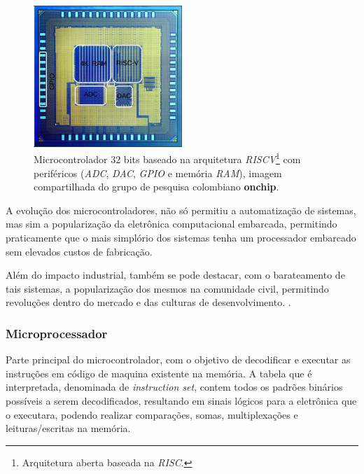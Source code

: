 \begin{figure}[!htb]
  \centering
  \caption[Microcontrolador na pastilha de silício.]{Microcontrolador 32 bits baseado na arquitetura \textit{RISCV}\footnote{Arquitetura aberta baseada na \textit{RISC}.}
  com periféricos (\textit{ADC}, \textit{DAC}, \textit{GPIO} e memória \textit{RAM}), imagem compartilhada do grupo de pesquisa
  colombiano \textbf{onchip}.}
  \label{fig:ricv}
  \includegraphics[width=0.5\textwidth]{figuras/riscv.jpg}
\end{figure}


A evolução dos microcontroladores, não só permitiu a automatização de sistemas, mas sim a popularização da eletrônica
computacional embarcada, permitindo praticamente que o mais simplório dos sistemas tenha um processador embarcado sem
elevados custos de fabricação.

Além do impacto industrial, também se pode destacar, com o barateamento de tais sistemas, a popularização dos mesmos na
comunidade civil, permitindo revoluções dentro do mercado e das culturas de desenvolvimento. .

\subsubsection{Microprocessador}

Parte principal do microcontrolador, com o objetivo de decodificar e executar as instruções em código de maquina existente
na memória. A tabela que é interpretada, denominada de \textit{instruction set}, contem todos os padrões binários possíveis
a serem decodificados, resultando em sinais lógicos para a eletrônica que o executara, podendo realizar comparações, somas,
multiplexações e leituras/escritas na memória.

